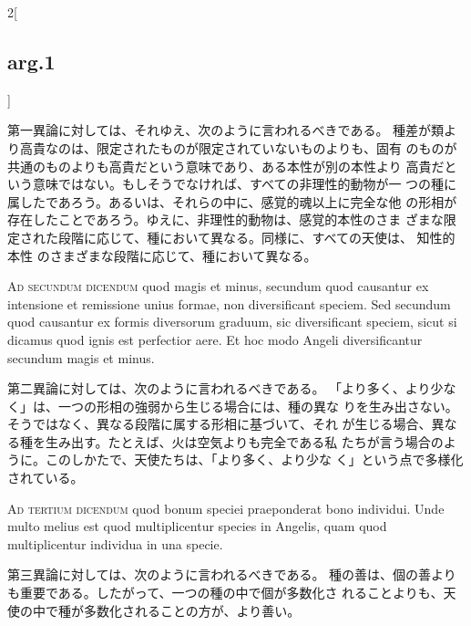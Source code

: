 \documentclass[paper=a4paper,fontsize=10pt,jafontsize=9pt,titlepage]{jlreq}
\begin{document}
\begin{paracol}{2}[\subsection{arg.1}]
\switchcolumn

第一異論に対しては、それゆえ、次のように言われるべきである。
種差が類より高貴なのは、限定されたものが限定されていないものよりも、固有
 のものが共通のものよりも高貴だという意味であり、ある本性が別の本性より
 高貴だという意味ではない。もしそうでなければ、すべての非理性的動物が一
 つの種に属したであろう。あるいは、それらの中に、感覚的魂以上に完全な他
 の形相が存在したことであろう。ゆえに、非理性的動物は、感覚的本性のさま
 ざまな限定された段階に応じて、種において異なる。同様に、すべての天使は、
 知性的本性 のさまざまな段階に応じて、種において異なる。

\switchcolumn*[\subsection{ad.2}]

{\scshape Ad secundum dicendum} quod magis et minus,
secundum quod causantur ex intensione et remissione unius formae, non
diversificant speciem. Sed secundum quod causantur ex formis diversorum
graduum, sic diversificant speciem, sicut si dicamus quod ignis est
perfectior aere. Et hoc modo Angeli diversificantur secundum magis et
minus.

\switchcolumn

第二異論に対しては、次のように言われるべきである。
「より多く、より少なく」は、一つの形相の強弱から生じる場合には、種の異な
 りを生み出さない。そうではなく、異なる段階に属する形相に基づいて、それ
 が生じる場合、異なる種を生み出す。たとえば、火は空気よりも完全である私
 たちが言う場合のように。このしかたで、天使たちは、「より多く、より少な
 く」という点で多様化されている。

\switchcolumn*[\subsection{ad.3}]

{\scshape Ad tertium dicendum} quod bonum speciei
praeponderat bono individui. Unde multo melius est quod multiplicentur
species in Angelis, quam quod multiplicentur individua in una specie.

\switchcolumn

第三異論に対しては、次のように言われるべきである。
種の善は、個の善よりも重要である。したがって、一つの種の中で個が多数化さ
 れることよりも、天使の中で種が多数化されることの方が、より善い。

\switchcolumn*[\subsection{ad.4}]


\end{paracol}
\end{document}
